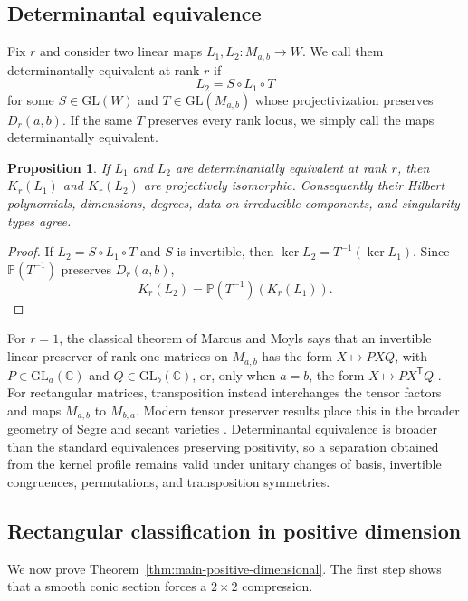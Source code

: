 \documentclass[11pt]{amsart}
\newcommand{\chg}[1]{#1}
\theoremstyle{plain}
\newtheorem{proposition}[theorem]{Proposition}
\theoremstyle{definition}
\theoremstyle{remark}
\begin{document}
\subsection{Determinantal equivalence}

Fix $r$ and consider two linear maps $L_1,L_2:M_{a,b}\to W$. \chg{We call them determinantally equivalent at rank $r$} if
\[
L_2=S\circ L_1\circ T
\]
for some $S\in\mathrm{GL}(W)$ and $T\in\mathrm{GL}(M_{a,b})$ whose projectivization preserves $D_r(a,b)$. If the same $T$ preserves every rank locus, we simply call the maps determinantally equivalent.

\begin{proposition}\label{prop:det-equivalence}
If $L_1$ and $L_2$ are \chg{determinantally equivalent at rank $r$}, then $K_r(L_1)$ and $K_r(L_2)$ are projectively isomorphic. Consequently their Hilbert polynomials, dimensions, degrees, \chg{data on irreducible components}, and singularity types agree.
\end{proposition}

\begin{proof}
If $L_2=S\circ L_1\circ T$ and $S$ is invertible, then $\ker L_2=T^{-1}(\ker L_1)$. Since $\mathbb P(T^{-1})$ preserves $D_r(a,b)$,
\[
K_r(L_2)=\mathbb P(T^{-1})(K_r(L_1)).
\]
\end{proof}

{For $r=1$, the classical theorem of Marcus and Moyls says that an invertible linear preserver of rank one matrices on $M_{a,b}$ has the form $X\mapsto PXQ$, with $P\in\mathrm{GL}_a(\mathbb C)$ and $Q\in\mathrm{GL}_b(\mathbb C)$, or, only when $a=b$, the form $X\mapsto PX^{\mathsf T}Q$ \cite{MarcusMoyls1959}. For rectangular matrices, transposition instead interchanges the tensor factors and maps $M_{a,b}$ to $M_{b,a}$.} Modern tensor preserver results place this in the broader geometry of Segre and secant varieties \cite{GesmundoHanLovitz2025}. Determinantal equivalence is broader than the standard equivalences preserving positivity, so a separation obtained from the kernel profile remains valid under unitary changes of basis, invertible congruences, permutations, and transposition symmetries.

\subsection{\chg{Rectangular classification in positive dimension}}\label{subsec:positive-dimensional}

We now prove Theorem~\ref{thm:main-positive-dimensional}. \chg{The first step shows that a smooth conic section forces a $2\times2$ compression.}
\end{document}
